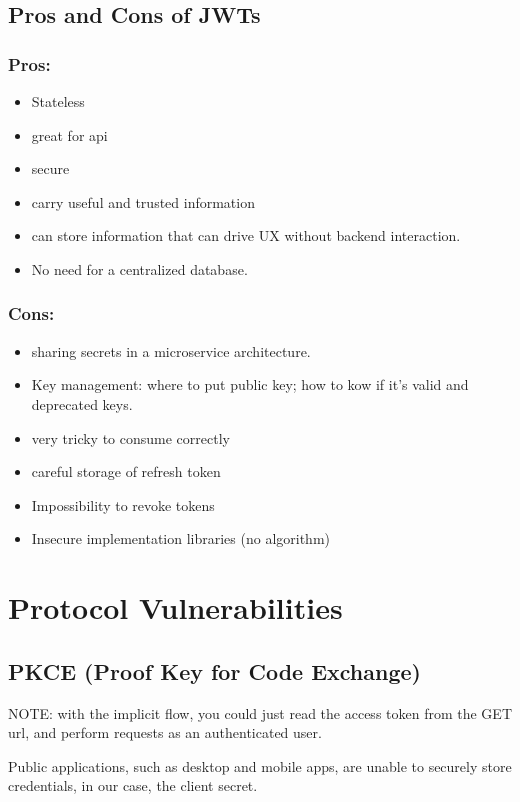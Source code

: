 \documentclass[11pt]{style}
\begin{document}
\subsection{Pros and Cons of JWTs}
\subsubsection{Pros:}
\begin{itemize}
    \item Stateless
    \item great for api
    \item secure
    \item carry useful and trusted information
    \item can store information that can drive UX without backend interaction.
    \item No need for a centralized database.
\end{itemize}
\subsubsection{Cons:}
\begin{itemize}
    \item sharing secrets in a microservice architecture.
    \item Key management: where to put public key; how to kow if it's valid and
        deprecated keys.
    \item very tricky to consume correctly
    \item careful storage of refresh token
    \item Impossibility to revoke tokens
    \item Insecure implementation libraries (no algorithm)
\end{itemize}

\section{Protocol Vulnerabilities}
\subsection{PKCE (Proof Key for Code Exchange)}
NOTE: with the implicit flow, you could just read the access token from the GET
url, and perform requests as an authenticated user.

Public applications, such as desktop and mobile apps, are unable to securely
store credentials, in our case, the client secret.
\end{document}
